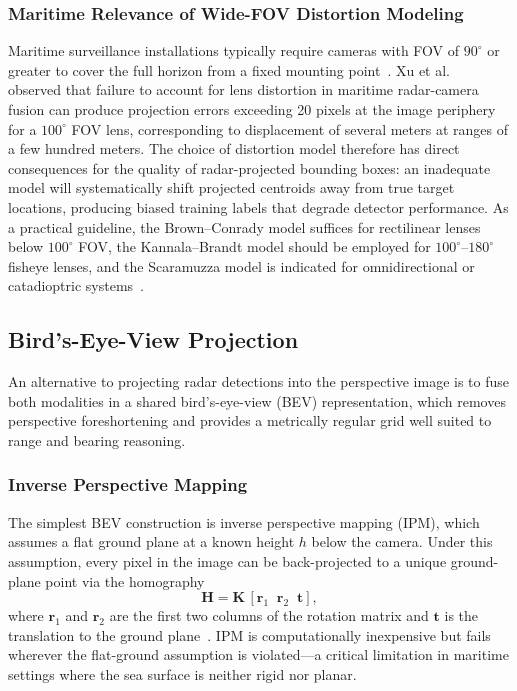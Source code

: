 \subsubsection{Maritime Relevance of Wide-FOV Distortion Modeling}

Maritime surveillance installations typically require cameras with FOV of $90^\circ$ or greater to cover the full horizon from a fixed mounting point~\cite{xu2024maritime}. Xu et al.~\cite{xu2024maritime} observed that failure to account for lens distortion in maritime radar-camera fusion can produce projection errors exceeding 20 pixels at the image periphery for a $100^\circ$ FOV lens, corresponding to displacement of several meters at ranges of a few hundred meters. The choice of distortion model therefore has direct consequences for the quality of radar-projected bounding boxes: an inadequate model will systematically shift projected centroids away from true target locations, producing biased training labels that degrade detector performance. As a practical guideline, the Brown--Conrady model suffices for rectilinear lenses below $100^\circ$ FOV, the Kannala--Brandt model should be employed for $100^\circ$--$180^\circ$ fisheye lenses, and the Scaramuzza model is indicated for omnidirectional or catadioptric systems~\cite{kannala2006generic, scaramuzza2006toolbox}.

\subsection{Bird's-Eye-View Projection}\label{subsec:bev}

An alternative to projecting radar detections into the perspective image is to fuse both modalities in a shared bird's-eye-view (BEV) representation, which removes perspective foreshortening and provides a metrically regular grid well suited to range and bearing reasoning.

\subsubsection{Inverse Perspective Mapping}

The simplest BEV construction is inverse perspective mapping (IPM), which assumes a flat ground plane at a known height $h$ below the camera. Under this assumption, every pixel in the image can be back-projected to a unique ground-plane point via the homography
\begin{equation}\label{eq:ipm}
  \mathbf{H} = \mathbf{K}\,[\mathbf{r}_1 \;\; \mathbf{r}_2 \;\; \mathbf{t}],
\end{equation}
where $\mathbf{r}_1$ and $\mathbf{r}_2$ are the first two columns of the rotation matrix and $\mathbf{t}$ is the translation to the ground plane~\cite{zhang2000flexible}. IPM is computationally inexpensive but fails wherever the flat-ground assumption is violated---a critical limitation in maritime settings where the sea surface is neither rigid nor planar.

